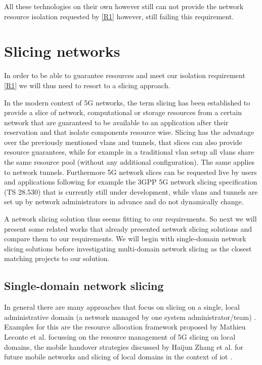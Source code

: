All these technologies on their own however still can not provide the network resource isolation requested by \ref{R1} however, still failing this requirement.

\section{Slicing networks}
In order to be able to guarantee resources and meet our isolation requirement \ref{R1} we will thus need to resort to a slicing approach.

In the modern context of 5G networks, the term slicing has been established to provide a slice of network, computational or storage resources from a certain network that are guaranteed to be available to an application after their reservation \cite{5G1,5G2,5G3} and that isolate components resource wise. Slicing has the advantage over the previously mentioned \acrshort{vlan}s and tunnels, that slices can also provide resource guarantees, while for example in a traditional \acrshort{vlan} setup all \acrshort{vlan}s share the same resource pool (without any additional configuration). The same applies to network tunnels. Furthermore 5G network slices can be requested live by users and applications following for example the 3GPP 5G network slicing specification (TS 28.530) \cite{3gpp28.530} that is currently still under development, while \acrshort{vlan}s and tunnels are set up by network administrators in advance and do not dynamically change.

A network slicing solution thus seems fitting to our requirements. So next we will present some related works that already presented network slicing solutions and compare them to our requirements. We will begin with single-domain network slicing solutions before investigating multi-domain network slicing as the closest matching projects to our solution.

\subsection{Single-domain network slicing} In general there are many approaches that focus on slicing on a single, local administrative domain (a network managed by one system administrator/team) \cite{SD1,SD2,SD3}. Examples for this are the resource allocation framework proposed by Mathieu Leconte et al. \cite{SD3} focussing on the resource management of 5G slicing on local domains, the mobile handover strategies discussed by Haijun Zhang et al. \cite{SD1} for future mobile networks and slicing of local domains in the context of \acrshort{iot} \cite{SD2}.

